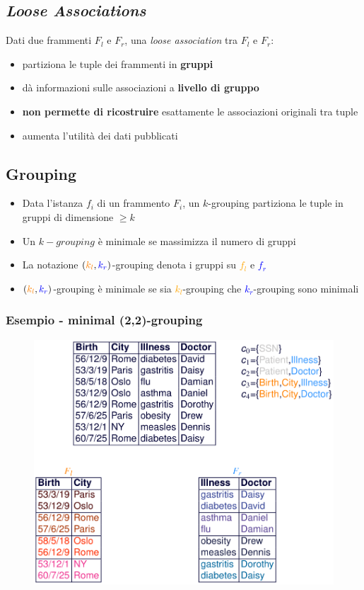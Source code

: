 \documentclass{report}
\begin{document}
\subsection{\textit{Loose Associations}}
Dati due frammenti $F_l$ e $F_r$, una \textit{loose association} tra $F_l$ e $F_r$:
\begin{itemize}
    \item partiziona le tuple dei frammenti in \textbf{gruppi}
    \item dà informazioni sulle associazioni a \textbf{livello di gruppo}
    \item \textbf{non permette di ricostruire} esattamente le associazioni originali tra tuple 
    \item aumenta l'utilità dei dati pubblicati 
\end{itemize} 

\subsection{Grouping}
\begin{itemize}
    \item Data l'istanza $f_i$ di un frammento $F_i$, un $k$-grouping partiziona le tuple in gruppi di dimensione
    $\geq k$
    \item Un $k-grouping$ è minimale se massimizza il numero di gruppi
    \item La notazione $(\textcolor{orange}{k_l}, \textcolor{blue}{k_r})$-grouping denota i gruppi su \textcolor{orange}{$f_l$} e \textcolor{blue}{$f_r$}
    \item $(\textcolor{orange}{k_l}, \textcolor{blue}{k_r})$-grouping è minimale se sia \textcolor{orange}{$k_l$}-grouping che \textcolor{blue}{$k_r$}-grouping sono minimali
\end{itemize}

\newpage
\subsubsection{Esempio - minimal (2,2)-grouping}
\begin{figure}[ht]
    \centering
    \includegraphics[width=1\linewidth]{images/publ-obf-ass/minimal-grouping.png}
\end{figure}
\end{document}
